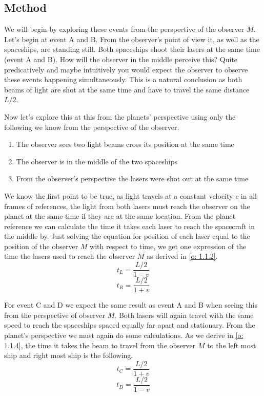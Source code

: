 \documentclass[reprint,english,notitlepage]{revtex4-2}
\begin{document}
  \subsection{Method}
  We will begin by exploring these events from the perspective of the observer $ M $. 
  Let's begin at event A and B. From the observer's point of view it, as well as the spaceships, are standing still. Both spaceships shoot their lasers at the same time (event A and B). How will the observer in the middle perceive this? Quite predicatively and maybe intuitively you would expect the observer to observe these events happening simultaneously. This is a natural conclusion as both beams of light are shot at the same time and have to travel the same distance $ L / 2 $. 
  
  Now let's explore this at this from the planets' perspective using only the following we know from the perspective of the observer.
  
  \begin{enumerate}
    \item The observer sees two light beams cross its position at the same time
    \item The observer is in the middle of the two spaceships 
    \item From the observer's perspective the lasers were shot out at the same time
  \end{enumerate}
  
  We know the first point to be true, as light travels at a constant velocity $ c $ in all frames of references, the light from both lasers must reach the observer on the planet at the same time if they are at the same location.
  From the planet reference we can calculate the time it takes each laser to reach the spacecraft in the middle by. Just solving the equation for position of each laser equal to the position of the observer $ M $ with respect to time, we get one expression of the time the lasers used to reach the observer $ M $ as derived in \ref{o: 1.1.2}. 
  \begin{equation}\label{eq: t_L}
    t_L = \frac{L /2}{1 - v}
  \end{equation}
  \begin{equation}\label{eq: t_R}
    t_R = \frac{L / 2}{1 + v}
  \end{equation}
  
  
  For event C and D we expect the same result as event A and B when seeing this from the perspective of observer $ M $. Both lasers will again travel with the same speed to reach the spaceships spaced equally far apart and stationary. 
  From the planet's perspective we must again do some calculations. As we derive in \ref{o: 1.1.4}, the time it takes the beam to travel from the observer $ M $ to the left most ship and right most ship is the following.
  \begin{equation}\label{eq: t_C}
    t_C = \frac{L / 2}{1 + v}
  \end{equation}
  \begin{equation}\label{eq: t_D}
    t_D = \frac{L / 2}{1 - v}
  \end{equation}
  
\end{document}

